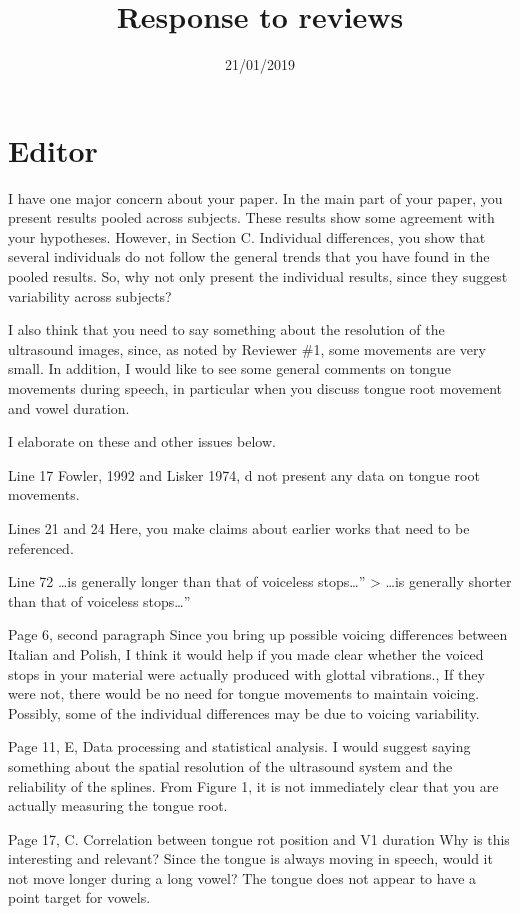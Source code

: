 \documentclass[]{article}
\title{Response to reviews}
\author{}
\date{21/01/2019}
\begin{document}
\maketitle

\hypertarget{editor}{%
\section{Editor}\label{editor}}

I have one major concern about your paper. In the main part of your
paper, you present results pooled across subjects. These results show
some agreement with your hypotheses. However, in Section C. Individual
differences, you show that several individuals do not follow the general
trends that you have found in the pooled results. So, why not only
present the individual results, since they suggest variability across
subjects?

I also think that you need to say something about the resolution of the
ultrasound images, since, as noted by Reviewer \#1, some movements are
very small. In addition, I would like to see some general comments on
tongue movements during speech, in particular when you discuss tongue
root movement and vowel duration.

I elaborate on these and other issues below.

Line 17 Fowler, 1992 and Lisker 1974, d not present any data on tongue
root movements.

Lines 21 and 24 Here, you make claims about earlier works that need to
be referenced.

Line 72 \ldots{}is generally longer than that of voiceless
stops\ldots{}'' \textgreater{} \ldots{}is generally shorter than that of
voiceless stops\ldots{}''

Page 6, second paragraph Since you bring up possible voicing differences
between Italian and Polish, I think it would help if you made clear
whether the voiced stops in your material were actually produced with
glottal vibrations., If they were not, there would be no need for tongue
movements to maintain voicing. Possibly, some of the individual
differences may be due to voicing variability.

Page 11, E, Data processing and statistical analysis. I would suggest
saying something about the spatial resolution of the ultrasound system
and the reliability of the splines. From Figure 1, it is not immediately
clear that you are actually measuring the tongue root.

Page 17, C. Correlation between tongue rot position and V1 duration Why
is this interesting and relevant? Since the tongue is always moving in
speech, would it not move longer during a long vowel? The tongue does
not appear to have a point target for vowels.
\end{document}
